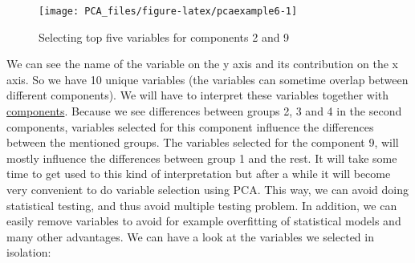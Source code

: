 \documentclass[
]{book}
\theoremstyle{definition}
\theoremstyle{definition}
\theoremstyle{definition}
\theoremstyle{remark}
\begin{document}
\begin{figure}

{\centering \texttt{[image: PCA\_files/figure-latex/pcaexample6-1]} 

}

\caption{Selecting top five variables for components 2 and 9}\label{fig:pcaexample6}
\end{figure}

We can see the name of the variable on the y axis and its contribution on the x axis. So we have 10 unique variables (the variables can sometime overlap between different components). We will have to interpret these variables together with \protect\hyperlink{pcaexample5}{components}. Because we see differences between groups 2, 3 and 4 in the second components, variables selected for this component influence the differences between the mentioned groups. The variables selected for the component 9, will mostly influence the differences between group 1 and the rest. It will take some time to get used to this kind of interpretation but after a while it will become very convenient to do variable selection using PCA. This way, we can avoid doing statistical testing, and thus avoid multiple testing problem. In addition, we can easily remove variables to avoid for example overfitting of statistical models and many other advantages.
We can have a look at the variables we selected in isolation:
\end{document}
